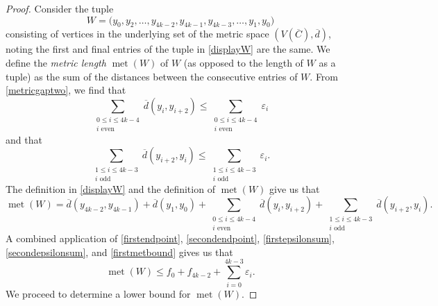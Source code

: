 \documentclass[12pt]{article}
\begin{document}
\begin{proof}
 Consider the tuple 
\begin{equation}\label{displayW}
 W = \big( y_0, y_2, \ldots, y_{4k-2}, y_{4k-1}, y_{4k-3}, \ldots, y_{1}, y_{0} \big) 
\end{equation}
 consisting of vertices in the underlying set of the metric space $(V(\overline{C}), \overline{d})$, noting the first and final entries of the 
 tuple in \eqref{displayW} are the same. 
 We define the \emph{metric length} $\operatorname{met}(W)$ of $W$ (as opposed to the length of $W$ as a tuple) 
 as the sum of the distances between the consecutive entries of $W$. 
 From \eqref{metricgaptwo}, we find that 
\begin{equation}\label{firstepsilonsum} 
 \sum_{\substack{ 0\leq i \leq 4k-4 \\ \text{$i$ even} }} \overline{d}(y_i, y_{i+2}) 
 \leq \sum_{\substack{0\leq i \leq 4k-4 \\ \text{$i$ even}}} \varepsilon_i 
\end{equation}
 and that 
\begin{equation}\label{secondepsilonsum} 
 \sum_{\substack{ 1 \leq i \leq 4 k - 3 \\ \text{$i$ odd} }} \overline{d}(y_{i+2}, y_{i}) 
 \leq \sum_{\substack{ 1 \leq i \leq 4 k - 3 \\ \text{$i$ odd}}} \varepsilon_{i}. 
\end{equation}
 The definition in \eqref{displayW} and the definition of $\operatorname{met}(W)$ give us that 
\begin{equation}\label{firstmetbound} 
 \operatorname{met}(W) = 
 \overline{d}(y_{4k-2}, y_{4k-1}) 
 + \overline{d}(y_{1}, y_{0}) 
 + \sum_{\substack{ 0\leq i \leq 4k-4 \\ \text{$i$ even} }} \overline{d}(y_i, y_{i+2}) + \sum_{\substack{ 1 \leq i \leq 4 k - 3 \\ \text{$i$ odd} }} \overline{d}(y_{i+2}, y_{i}). 
\end{equation}
 A combined application of \eqref{firstendpoint}, 
 \eqref{secondendpoint}, \eqref{firstepsilonsum}, 
 \eqref{secondepsilonsum}, and \eqref{firstmetbound} gives us that 
\begin{equation}\label{metWabove}
 \operatorname{met}(W) \leq f_0 + f_{4k-2} + \sum_{i=0}^{4k-3} \varepsilon_i.
\end{equation}
 We proceed to determine a lower bound for $\operatorname{met}(W)$. 


\end{proof}
\end{document}
